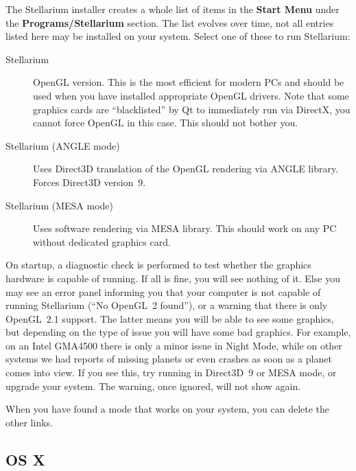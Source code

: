 The Stellarium installer creates a whole list of items in the
\textbf{Start Menu} under the \textbf{Programs/Stellarium}
section. The list evolves over time, not all entries listed here 
may be installed on your system. Select one of these to run Stellarium:
\begin{description}
\item[Stellarium] OpenGL version. This is the most efficient for
  modern PCs and should be used when you have installed appropriate
  OpenGL drivers. Note that some graphics cards are ``blacklisted'' by
  Qt to immediately run via DirectX, you cannot force OpenGL in this
  case. This should not bother you.
\item[Stellarium (ANGLE mode)] Uses Direct3D translation of the OpenGL
  rendering via ANGLE library.  Forces Direct3D version~9.
\item[Stellarium (MESA mode)] Uses software rendering via MESA
  library. This should work on any PC without dedicated graphics card.
\end{description}
On startup, a diagnostic check is performed to test whether the
graphics hardware is capable of running. If all is fine, you will see
nothing of it.  Else you may see an error panel informing you that
your computer is not capable of running Stellarium (``No OpenGL~2
found''), or a warning that there is only OpenGL~2.1 support. The
latter means you will be able to see some graphics, but depending on
the type of issue you will have some bad graphics. For example, on an
Intel GMA4500 there is only a minor issue in Night Mode, while on
other systems we had reports of missing planets or even crashes as
soon as a planet comes into view. If you see this, try running in
Direct3D~9 or MESA mode, or upgrade your system. The warning, once
ignored, will not show again.

When you have found a mode that works on your system, you can delete
the other links.

\subsection{OS X}
\label{sec:GettingStarted:Running:MacOSX}

